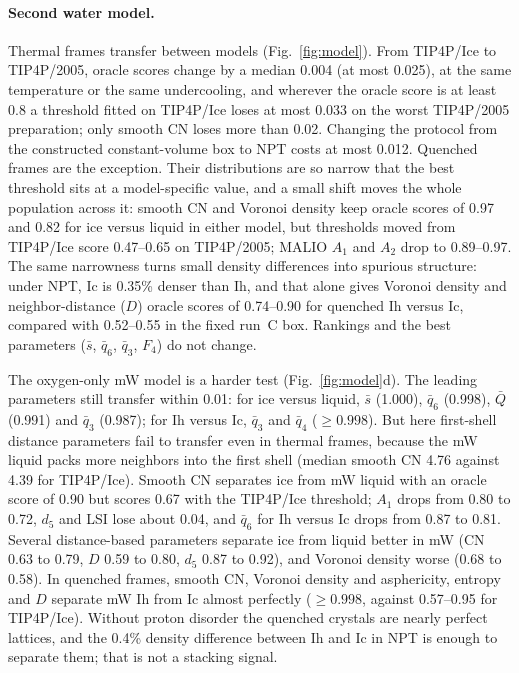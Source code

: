 \documentclass{template1}
\begin{document}
\paragraph{Second water model.}\label{sec:model} Thermal frames transfer
between models (Fig.~\ref{fig:model}). From TIP4P/Ice to TIP4P/2005, oracle
scores change by a median 0.004 (at most 0.025), at the same temperature or
the same undercooling, and wherever the oracle score is at least 0.8 a
threshold fitted on TIP4P/Ice loses at most 0.033 on the worst TIP4P/2005
preparation; only smooth CN loses more than 0.02. Changing the protocol from
the constructed constant-volume box to NPT costs at most 0.012. Quenched
frames are the exception. Their distributions are so narrow that the best
threshold sits at a model-specific value, and a small shift moves the whole
population across it: smooth CN and Voronoi density keep oracle scores of
0.97 and 0.82 for ice versus liquid in either model, but thresholds moved
from TIP4P/Ice score 0.47--0.65 on TIP4P/2005; MALIO $A_1$ and $A_2$ drop to
0.89--0.97. The same narrowness turns small density differences into
spurious structure: under NPT, Ic is 0.35\% denser than Ih, and that alone
gives Voronoi density and neighbor-distance ($D$) oracle scores of 0.74--0.90 for quenched Ih
versus Ic, compared with 0.52--0.55 in the fixed run~C box. Rankings and the
best parameters ($\bar s$, $\bar q_6$, $\bar q_3$, $F_4$) do not change.

The oxygen-only mW model is a harder test (Fig.~\ref{fig:model}d). The
leading parameters still transfer within 0.01: for ice versus liquid,
$\bar s$ (1.000), $\bar q_6$ (0.998), $\bar Q$ (0.991) and $\bar q_3$ (0.987);
for Ih versus Ic, $\bar q_3$ and $\bar q_4$ ($\ge 0.998$). But here
first-shell distance parameters fail to transfer even in thermal frames,
because the mW liquid packs more neighbors into the first shell (median
smooth CN 4.76 against 4.39 for TIP4P/Ice). Smooth CN separates ice from mW
liquid with an oracle score of 0.90 but scores 0.67 with the TIP4P/Ice
threshold; $A_1$ drops from 0.80 to 0.72, $d_5$ and LSI lose about 0.04, and
$\bar q_6$ for Ih versus Ic drops from 0.87 to 0.81. Several distance-based
parameters separate ice from liquid better in mW (CN 0.63 to 0.79, $D$ 0.59
to 0.80, $d_5$ 0.87 to 0.92), and Voronoi density worse (0.68 to 0.58). In
quenched frames, smooth CN, Voronoi density and asphericity, entropy and $D$
separate mW Ih from Ic almost perfectly ($\ge 0.998$, against 0.57--0.95 for
TIP4P/Ice). Without proton disorder the quenched crystals are nearly perfect
lattices, and the 0.4\% density difference between Ih and Ic in NPT is
enough to separate them; that is not a stacking signal.
\end{document}
